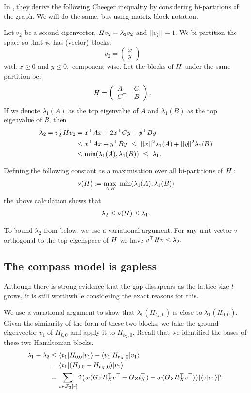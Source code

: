 \documentclass[12pt]{article}
\begin{document}
In \cite{Friedland2002}, they derive the following Cheeger inequality
by considering bi-partitions of the graph. We will do the
same, but using matrix block notation.

Let $v_2$ be a second eigenvector, $ H v_2 = \lambda_2 v_2 $ 
and $||v_2||=1$.
We bi-partition the space 
so that $v_2$ has (vector) blocks:
$$
v_2 = \left( \begin{array}{l}
x\\
y\end{array} \right)\quad
$$
with $x\ge 0$ and $y\le 0,$ component-wise.
Let the blocks of $H$ under the same partition be:
$$
H = \left( \begin{array}{ll}
A&C\\
C^\top&B\end{array} \right).\quad
$$
If we denote $\lambda_1(A)$ as the top eigenvalue of $A$ and
$\lambda_1(B)$ as the top eigenvalue of $B$,
then
\begin{align*}
\lambda_2 = v_2^\top H v_2 &= x^\top A x + 2 x^\top C y + y^\top B y \\
        &\le x^\top A x + y^\top B y\ \le\ ||x||^2 \lambda_1(A) + ||y||^2 \lambda_1(B) \\
        &\le \mbox{min}(\lambda_1(A), \lambda_1(B))\ \le\ \lambda_1.
\end{align*}

Defining the following constant as a maximisation over
all bi-partitions of $H:$
$$
    \nu(\Ham) := \max_{A, B}\ \mbox{min}(\lambda_1(A), \lambda_1(B))
$$
the above calculation shows that
$$
    \lambda_2 \le \nu(H) \le \lambda_1.
$$

To bound $\lambda_2$ from below, we use a variational argument.
For any unit vector $v$ orthogonal to the top eigenspace of $H$ we
have $v^\top H v \le \lambda_2.$


%

\subsection{The compass model is gapless}

Although there is strong evidence that the gap dissapears as the lattice size
$l$ grows, it is still worthwhile considering the exact reasons for this.

We use a variational argument to show that $\lambda_1(H_{t_X,0})$
is close to $\lambda_1(H_{0,0}).$
Given the similarity of the form of these two blocks, we
take the ground eigenvector $v_1$ of $H_{0,0}$ and apply it
to $H_{t_X,0}$. %
Recall that we identified the bases of these two Hamiltonian blocks.
\begin{align*}
    \lambda_1 - \lambda_2 &\le \langle{v_1}|H_{0,0}|{v_1}\rangle - \langle{v_1}|H_{t_X,0}|{v_1}\rangle  \\
            &= \langle{v_1}|(H_{0,0} - H_{t_X,0})|{v_1}\rangle  \\
    &= \sum_{v\in\mathcal{F}_2[r]} 2\bigl(w(G_Z R_X^\top v^\top + G_Z t_X^\top) -w(G_Z R_X^\top v^\top)\bigr) 
    |\langle{v}|{v_1}\rangle|^2.
\end{align*}
\end{document}
